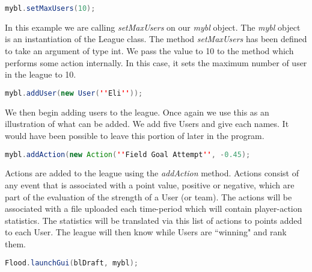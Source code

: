 \documentclass[12pt]{report}
\begin{document}
\begin{lstlisting}[language=Java,label=some-code,caption=Setting maximum users]
mybl.setMaxUsers(10);
\end{lstlisting}

\begin{doublespace}
In this example we are calling \textit{setMaxUsers} on our \textit{mybl} object. The \textit{mybl} object is an instantiation of the League class. The method \textit{setMaxUsers} has been defined to take an argument of type int. We pass the value to 10 to the method which performs some action internally. In this case, it sets the maximum number of user in the league to 10.
\end{doublespace}

\begin{lstlisting}[language=Java,label=some-code,caption=Adding a User]
mybl.addUser(new User(''Eli''));
\end{lstlisting}

\begin{doublespace}
We then begin adding users to the league. Once again we use this as an illustration of what can be added. We add five Users and give each names. It would have been possible to leave this portion of later in the program.
\end{doublespace}

\begin{lstlisting}[language=Java,label=some-code,caption=Adding an Action]
mybl.addAction(new Action(''Field Goal Attempt'', -0.45);
\end{lstlisting}

\begin{doublespace}
Actions are added to the league using the \textit{addAction} method. Actions consist of any event that is associated with a point value, positive or negative, which are part of the evaluation of the strength of a User (or team). The actions will be associated with a file uploaded each time-period which will contain player-action statistics. The statistics will be translated via this list of actions to points added to each User. The league will then know while Users are ``winning" and rank them. 
\end{doublespace}

\begin{lstlisting}[language=Java,label=some-code,caption=Launching the GUI]
Flood.launchGui(blDraft, mybl);
\end{lstlisting}
\end{document}
